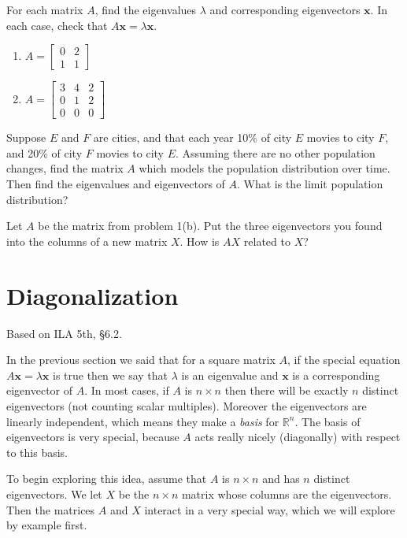 \documentclass[11pt,oneside]{amsbook}
\newcommand{\R}{\mathbb R}
\theoremstyle{definition}
\theoremstyle{plain}
\theoremstyle{definition}
\theoremstyle{remark}
\numberwithin{equation}{section}
\numberwithin{figure}{section}
\newcounter{activityitem}
\newenvironment{activity}{\begin{list}{\arabic{activityitem}.}{\usecounter{activityitem}\setlength{\itemsep}{.2in}}}{\end{list}}
\begin{document}
\begin{activity}
  \item For each matrix $A$, find the eigenvalues $\lambda$ and corresponding eigenvectors $\mathbf{x}$. In each case, check that $A\mathbf{x}=\lambda\mathbf{x}$.
  \begin{enumerate}
    \item $A=\begin{bmatrix}0&2\\1&1\end{bmatrix}$
    \item $A=\begin{bmatrix}
      3 & 4 & 2 \\
      0 & 1 & 2 \\
      0 & 0 & 0
      \end{bmatrix}$
  \end{enumerate}
  \item Suppose $E$ and $F$ are cities, and that each year 10\% of city $E$ movies to city $F$, and 20\% of city $F$ movies to city $E$. Assuming there are no other population changes, find the matrix $A$ which models the population distribution over time. Then find the eigenvalues and eigenvectors of $A$. What is the limit population distribution?
  \item Let $A$ be the matrix from problem 1(b). Put the three eigenvectors you found into the columns of a new matrix $X$. How is $AX$ related to $X$?
\end{activity}


\newpage
\section{Diagonalization}

Based on ILA 5th, \S 6.2.

In the previous section we said that for a square matrix $A$, if the special equation $A\mathbf{x}=\lambda\mathbf{x}$ is true then we say that $\lambda$ is an eigenvalue and $\mathbf{x}$ is a corresponding eigenvector of $A$. In most cases, if $A$ is $n\times n$ then there will be exactly $n$ distinct eigenvectors (not counting scalar multiples). Moreover the eigenvectors are linearly independent, which means they make a \emph{basis} for $\R^n$. The basis of eigenvectors is very special, because $A$ acts really nicely (diagonally) with respect to this basis.

To begin exploring this idea, assume that $A$ is $n\times n$ and has $n$ distinct eigenvectors. We let $X$ be the $n\times n$ matrix whose columns are the eigenvectors. Then the matrices $A$ and $X$ interact in a very special way, which we will explore by example first.
\end{document}
